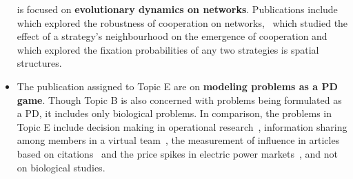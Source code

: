 \documentclass{article}
\theoremstyle{definition}
\begin{document}
\begin{itemize}
    is focused on \textbf{evolutionary dynamics on networks}. Publications include
    \citep{ichinose2013robustness} which explored the robustness of cooperation
    on networks,~\citep{wang2012spatial} which studied the effect of a strategy's neighbourhood
    on the emergence of cooperation and~\citep{chen2016fixation} which explored
    the fixation probabilities of any two strategies is spatial
    structures.
    \item The publication assigned to Topic E are on \textbf{modeling problems
    as a PD game}. Though Topic B is also concerned with problems being formulated
    as a PD, it includes only biological problems. In comparison, the problems
    in Topic E include decision making in
    operational research~\citep{ormerod2010or}, information sharing among members
    in a virtual team~\citep{feng2008trilateral}, the measurement of influence
    in articles based on citations~\citep{hutchins2016relative} and the price
    spikes in electric power markets~\citep{Guan2002}, and not on biological studies.
\end{itemize}
\end{document}
